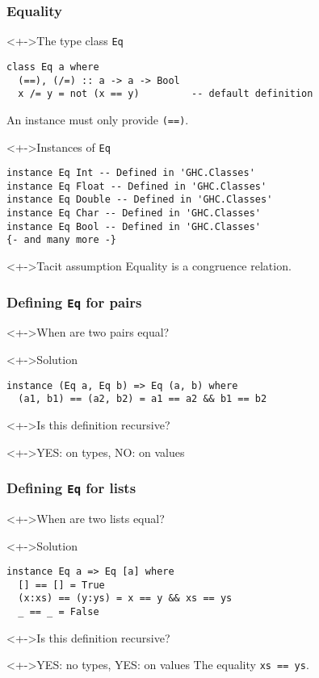\documentclass{beamer}
\begin{document}
\begin{frame}[fragile]
  \frametitle{Equality}
  \begin{block}<+->{The type class \texttt{Eq}}
\begin{lstlisting}
class Eq a where
  (==), (/=) :: a -> a -> Bool
  x /= y = not (x == y)         -- default definition
\end{lstlisting}
    An instance must only provide \texttt{(==)}.
  \end{block}
  \begin{block}<+->{Instances of \texttt{Eq}}
\begin{lstlisting}
instance Eq Int -- Defined in 'GHC.Classes'
instance Eq Float -- Defined in 'GHC.Classes'
instance Eq Double -- Defined in 'GHC.Classes'
instance Eq Char -- Defined in 'GHC.Classes'
instance Eq Bool -- Defined in 'GHC.Classes'
{- and many more -}
\end{lstlisting}
  \end{block}
  \begin{exampleblock}<+->{Tacit assumption}
    Equality is a congruence relation.
  \end{exampleblock}
\end{frame}
\begin{frame}[fragile]
  \frametitle{Defining \texttt{Eq} for pairs}
  \begin{block}<+->{When are two pairs equal?}
  \end{block}
  \begin{block}<+->{Solution}
\begin{lstlisting}
instance (Eq a, Eq b) => Eq (a, b) where
  (a1, b1) == (a2, b2) = a1 == a2 && b1 == b2
\end{lstlisting}
  \end{block}
  \begin{block}<+->{Is this definition recursive?}
  \end{block}
  \begin{alertblock}<+->{YES: on types, NO: on values}
  \end{alertblock}
\end{frame}
\begin{frame}[fragile]
  \frametitle{Defining \texttt{Eq} for lists}
  \begin{block}<+->{When are two lists equal?}
  \end{block}
  \begin{block}<+->{Solution}
\begin{lstlisting}
instance Eq a => Eq [a] where
  [] == [] = True
  (x:xs) == (y:ys) = x == y && xs == ys
  _ == _ = False
\end{lstlisting}
  \end{block}
  \begin{block}<+->{Is this definition recursive?}
  \end{block}
  \begin{alertblock}<+->{YES: no types, YES: on values}
    The equality \texttt{xs == ys}.
  \end{alertblock}
\end{frame}
\end{document}
